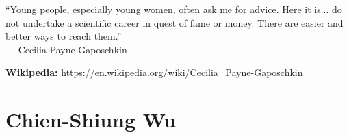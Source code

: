 \documentclass[12pt,a4paper]{article}
\newcommand{\pullquote}[2]{%
  \begin{tcolorbox}[quotebox]
  ``#1''\\[4pt]
  {\small\normalfont\color{medgray}--- #2}
  \end{tcolorbox}
}
\begin{document}
\pullquote{Young people, especially young women, often ask me for advice. Here it is... do not undertake a scientific career in quest of fame or money. There are easier and better ways to reach them.}{Cecilia Payne-Gaposchkin}

\textbf{Wikipedia:} \url{https://en.wikipedia.org/wiki/Cecilia_Payne-Gaposchkin}

\newpage

\section{Chien-Shiung Wu}
\end{document}
